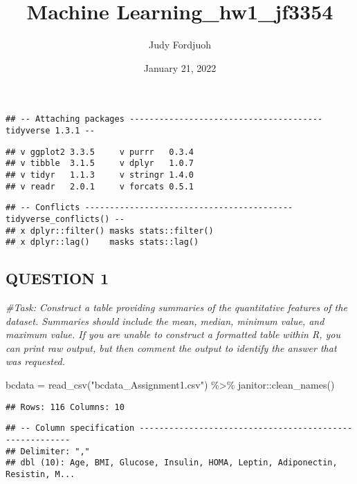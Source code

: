 \documentclass[
]{article}
\title{Machine Learning\_hw1\_jf3354}
\author{Judy Fordjuoh}
\date{January 21, 2022}
\newenvironment{Shaded}{\begin{snugshade}}{\end{snugshade}}
\newcommand{\CommentTok}[1]{\textcolor[rgb]{0.56,0.35,0.01}{\textit{#1}}}
\newcommand{\FunctionTok}[1]{\textcolor[rgb]{0.00,0.00,0.00}{#1}}
\newcommand{\NormalTok}[1]{#1}
\newcommand{\OtherTok}[1]{\textcolor[rgb]{0.56,0.35,0.01}{#1}}
\newcommand{\SpecialCharTok}[1]{\textcolor[rgb]{0.00,0.00,0.00}{#1}}
\newcommand{\StringTok}[1]{\textcolor[rgb]{0.31,0.60,0.02}{#1}}
\begin{document}
\maketitle

\begin{verbatim}
## -- Attaching packages --------------------------------------- tidyverse 1.3.1 --
\end{verbatim}

\begin{verbatim}
## v ggplot2 3.3.5     v purrr   0.3.4
## v tibble  3.1.5     v dplyr   1.0.7
## v tidyr   1.1.3     v stringr 1.4.0
## v readr   2.0.1     v forcats 0.5.1
\end{verbatim}

\begin{verbatim}
## -- Conflicts ------------------------------------------ tidyverse_conflicts() --
## x dplyr::filter() masks stats::filter()
## x dplyr::lag()    masks stats::lag()
\end{verbatim}

\hypertarget{question-1}{%
\subsection{QUESTION 1}\label{question-1}}

\begin{Shaded}
\begin{Highlighting}[]
\CommentTok{\#Task: Construct a table providing summaries of the quantitative features of the dataset. Summaries should include the mean, median, minimum value, and maximum value. If you are unable to construct a formatted table within R, you can print raw output, but then comment the output to identify the answer that was requested.}

\NormalTok{bcdata }\OtherTok{=} \FunctionTok{read\_csv}\NormalTok{(}\StringTok{"bcdata\_Assignment1.csv"}\NormalTok{) }\SpecialCharTok{\%\textgreater{}\%}
\NormalTok{    janitor}\SpecialCharTok{::}\FunctionTok{clean\_names}\NormalTok{()}
\end{Highlighting}
\end{Shaded}

\begin{verbatim}
## Rows: 116 Columns: 10
\end{verbatim}

\begin{verbatim}
## -- Column specification --------------------------------------------------------
## Delimiter: ","
## dbl (10): Age, BMI, Glucose, Insulin, HOMA, Leptin, Adiponectin, Resistin, M...
\end{verbatim}
\end{document}
